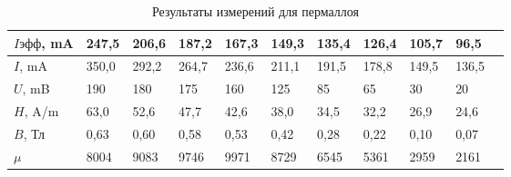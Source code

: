 \begin{enumerate}
\begin{table}[h]
\centering
\begin{tabular}{|l|l|l|l|l|l|l|l|l|l|l|}
\hline
$I эфф$, mA & 247,5 & 206,6 & 187,2 & 167,3 & 149,3 & 135,4 & 126,4 & 105,7 & 96,5  \\ \hline
$I$, mA & 350,0 & 292,2 & 264,7 & 236,6 & 211,1 & 191,5 & 178,8 & 149,5 & 136,5  \\ \hline
$U$, mB & 190 & 180 & 175 & 160 & 125 & 85 & 65 & 30 & 20  \\ \hline
$H$, A/m & 63,0 & 52,6 & 47,7 & 42,6 & 38,0 & 34,5 & 32,2 & 26,9 & 24,6  \\ \hline
$B$, Тл & 0,63 & 0,60 & 0,58 & 0,53 & 0,42 & 0,28 & 0,22 & 0,10 & 0,07   \\ \hline
$\mu$ & 8004 & 9083 & 9746 & 9971 & 8729 & 6545 & 5361 & 2959 & 2161   \\ \hline
\end{tabular}
\caption{Результаты измерений для пермаллоя}
\end{table}



\end{enumerate}
